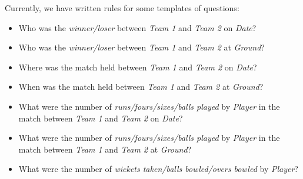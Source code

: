 \documentclass[a4paper]{article}
\begin{document}
Currently, we have written rules for some templates of questions:
\begin{itemize}
	\item Who was the \emph{winner/loser} between \emph{Team 1} and \emph{Team 2} on \emph{Date}?
	\item Who was the \emph{winner/loser} between \emph{Team 1} and \emph{Team 2} at \emph{Ground}?
	\item Where was the match held between \emph{Team 1} and \emph{Team 2} on \emph{Date}?
	\item When was the match held between \emph{Team 1} and \emph{Team 2} at \emph{Ground}?
	\item What were the number of \emph{runs/fours/sixes/balls played} by \emph{Player} in the match between \emph{Team 1} and \emph{Team 2} on \emph{Date}?
	\item What were the number of \emph{runs/fours/sixes/balls played} by \emph{Player} in the match between \emph{Team 1} and \emph{Team 2} at \emph{Ground}?
	\item What were the number of \emph{wickets taken/balls bowled/overs bowled} by \emph{Player}?
\end{itemize}



\end{document}
